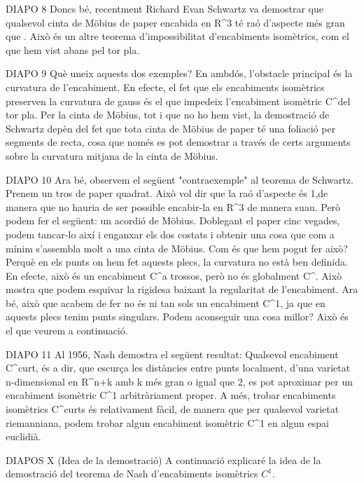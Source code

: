 DIAPO 8
Doncs bé, recentment Richard Evan Schwartz va demostrar que qualsevol cinta de Möbius de paper encabida en R^3 té raó d'aspecte més gran que .
Això és un altre teorema d'impossibilitat d'encabiments isomètrics, com el que hem vist abans pel tor pla.

DIAPO 9
Què uneix aquests dos exemples? En ambdós, l'obstacle principal és la curvatura de l'encabiment. En efecte, el fet que els encabiments isomètrics preserven la curvatura de gauss és el que impedeix l'encabiment isomètric C^\infty del tor pla. Per la cinta de Möbius, tot i que no ho hem vist, la demostració de Schwartz depèn del fet que tota cinta de Möbius de paper té una foliació per segments de recta, cosa que només es pot demostrar a través de certs arguments sobre la curvatura mitjana de la cinta de Möbius.

DIAPO 10
Ara bé, observem el següent "contraexemple" al teorema de Schwartz. Prenem un tros de paper quadrat. Això vol dir que la raó d'aspecte és 1,de manera que no hauria de ser possible encabir-la en R^3 de manera suau. Però podem fer el següent: un acordió de Möbius. Doblegant el paper cinc vegades, podem tancar-lo així i enganxar els dos costats i obtenir una cosa que com a mínim s'assembla molt a una cinta de Möbius. Com és que hem pogut fer això? Perquè en els punts on hem fet aquests plecs, la curvatura no està ben definida. En efecte, això és un encabiment C^\infty a trossos, però no és globalment C^\infty. 
Això mostra que podem esquivar la rigidesa baixant la regularitat de l'encabiment. Ara bé, això que acabem de fer no és ni tan sols un encabiment C^1, ja que en aquests plecs tenim punts singulars. Podem aconseguir una cosa millor? Això és el que veurem a continuació.

DIAPO 11
Al 1956, Nash demostra el següent resultat:
Qualsevol encabiment C^\infty curt, és a dir, que escurça les distàncies entre punts localment, d'una varietat n-dimensional en R^{n+k} amb k més gran o igual que 2, es pot aproximar per un encabiment isomètric C^1 arbitràriament proper. 
A més, trobar encabiments isomètrics C^\infty curts és relativament fàcil, de manera que per qualsevol varietat riemanniana, podem trobar algun encabiment isomètric C^1 en algun espai euclidià.

DIAPOS X (Idea de la demostració)
A continuació explicaré la idea de la demostració del teorema de Nash d'encabiments isomètrics $C^1$.

